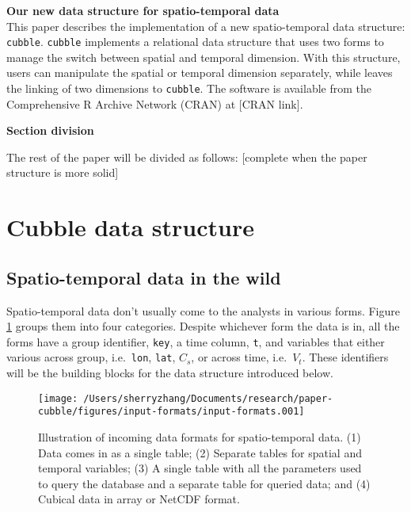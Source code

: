 \documentclass[
]{jss}
\begin{document}
\textbf{Our new data structure for spatio-temporal data}\\
This paper describes the implementation of a new spatio-temporal data
structure: \texttt{cubble}. \texttt{cubble} implements a relational data
structure that uses two forms to manage the switch between spatial and
temporal dimension. With this structure, users can manipulate the
spatial or temporal dimension separately, while leaves the linking of
two dimensions to \texttt{cubble}. The software is available from the
Comprehensive R Archive Network (CRAN) at {[}CRAN link{]}. \newline

\textbf{Section division}

The rest of the paper will be divided as follows: {[}complete when the
paper structure is more solid{]}

\newpage

\hypertarget{cubble-data-structure}{%
\section{Cubble data structure}\label{cubble-data-structure}}

\hypertarget{spatio-temporal-data-in-the-wild}{%
\subsection{Spatio-temporal data in the
wild}\label{spatio-temporal-data-in-the-wild}}

Spatio-temporal data don't usually come to the analysts in various
forms. Figure \ref{fig:cubble-diagram} groups them into four categories.
Despite whichever form the data is in, all the forms have a group
identifier, \texttt{key}, a time column, \texttt{t}, and variables that
either various across group, i.e.~\texttt{lon}, \texttt{lat}, \(C_s\),
or across time, i.e.~\(V_t\). These identifiers will be the building
blocks for the data structure introduced below.

\begin{CodeChunk}
\begin{figure}

{\centering \texttt{[image: /Users/sherryzhang/Documents/research/paper-cubble/figures/input-formats/input-formats.001]} 

}

\caption[Illustration of incoming data formats for spatio-temporal data]{Illustration of incoming data formats for spatio-temporal data. (1) Data comes in as a single table; (2) Separate tables for spatial and temporal variables; (3) A single table with all the parameters used to query the database and a separate table for queried data; and (4) Cubical data in array or NetCDF format.}\label{fig:cubble-diagram}
\end{figure}
\end{CodeChunk}
\end{document}
